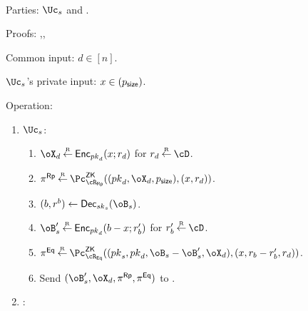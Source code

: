 \begin{protocol}~\label{prot:ConfidentialTransactions:Transfer}
	\item[Parties:] $\Uc_s$ and \Cc.
	
\item[Proofs:]   \piZK{\rRp},\piZK{\rEq},\piZK{\rLrgEq}



	
	\item[Common input:] $d\in [n]$.
	
	\item[$\Uc_s$'s private  input:] $x \in (p_{\mathsf{size}})$.
	
\item[Operation:] ~
	
	\begin{enumerate}
		\item  $\Uc_s$: 
		
		\begin{enumerate}
			\item $\oX_d \getsr \Enc_{\pk_d}(x;r_d)$ for $r_d \getsr \cD$.
			
		
			\item $\pi^\RPs \getsr \pZK{\rRp}((\pk_d,\oX_d,\psize),(x,r_d))$.
			
			
			
			
			\item $(b,r^b) \asn \Dec_{\sk_s}(\oB_s)$.
			
			\item $\oB_s' \getsr \Enc_{\pk_d}(b-x;r_b')$ for $r_b' \getsr \cD$.
			
			
		 

			
			
			\item $\pi^\Eqs \getsr \pZK{\rEq}((\pk_s,\pk_d,\oB_s- \oB_s',\oX_d),(x,r_b - r_b',r_d))$.
			
			
		
			
			
			
			\item Send $(\oB_s',\oX_d,\pi^\RPs,\pi^\Eqs)$ to \Cc.
		\end{enumerate}
		
		
		\item  \Cc: 
		

\end{enumerate}
\end{protocol}
